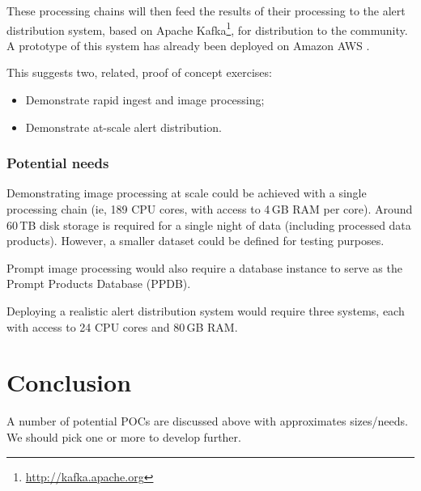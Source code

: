 These processing chains will then feed the results of their processing to the alert distribution system, based on Apache Kafka\footnote{\url{http://kafka.apache.org}}, for distribution to the community.
A prototype of this system has already been deployed on Amazon AWS .

This suggests two, related, proof of concept exercises:

\begin{itemize}

\item{Demonstrate rapid ingest and image processing;}
\item{Demonstrate at-scale alert distribution.}

\end{itemize}

\subsubsection{Potential needs}

Demonstrating image processing at scale could be achieved with a single processing chain (ie, 189 CPU cores, with access to 4\,GB RAM per core).
Around 60\,TB disk storage is required for a single night of data (including processed data products).
However, a smaller dataset could be defined for testing purposes.

Prompt image processing would also require a database instance to serve as the Prompt Products Database (PPDB).

Deploying a realistic alert distribution system would require three systems, each with access to 24 CPU cores and 80\,GB RAM.

\section{Conclusion}
A number of potential POCs are discussed above with approximates sizes/needs.
We should pick one or more to develop further.

